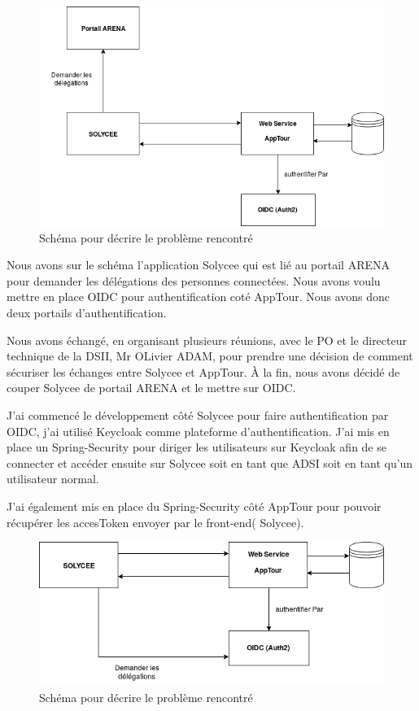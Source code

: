 \documentclass[12pt]{article}
\begin{document}
\begin{figure}[H]
	\centering
 		\includegraphics[width=1\textwidth]{diagrammes/schemaOIDC.png}
  		\caption{Schéma pour décrire le problème rencontré}\end{figure}	

Nous avons sur le schéma l'application Solycee qui est lié au portail ARENA pour demander les délégations des personnes connectées. Nous avons voulu mettre en place OIDC pour authentification coté AppTour. Nous avons donc deux portails d'authentification. 


Nous avons échangé, en organisant plusieurs réunions, avec le PO et le directeur technique de la DSII, Mr OLivier ADAM, pour prendre une décision de comment sécuriser les échanges entre  Solycee et AppTour. À la fin, nous avons décidé de couper Solycee de portail ARENA et le mettre sur OIDC. 

J'ai commencé le développement côté Solycee pour faire authentification par OIDC, j'ai utilisé Keycloak comme plateforme d'authentification. J'ai mis en place un Spring-Security pour diriger les utilisateurs sur Keycloak afin de se connecter et accéder ensuite sur Solycee soit en tant que ADSI soit en tant qu'un utilisateur normal. 

J'ai également mis en place du Spring-Security côté AppTour pour pouvoir récupérer les accesToken envoyer par le front-end( Solycee). 

\begin{figure}[H]
	\centering
 		\includegraphics[width=1\textwidth]{diagrammes/schemaOIDC2.png}
  		\caption{Schéma pour décrire le problème rencontré}\end{figure}	
\end{document}
